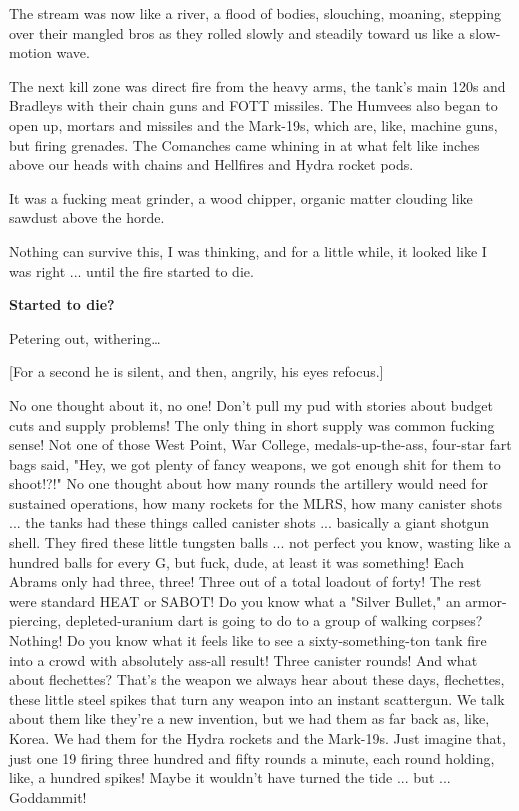 \documentclass[10pt,a5paper,twoside]{book}
\begin{document}
The stream was now like a river, a flood of bodies, slouching, moaning, stepping over their mangled bros as they rolled slowly and steadily toward us like a slow-motion wave.

The next kill zone was direct fire from the heavy arms, the tank's main 120s and Bradleys with their chain guns and FOTT missiles. The Humvees also began to open up, mortars and missiles and the Mark-19s, which are, like, machine guns, but firing grenades. The Comanches came whining in at what felt like inches above our heads with chains and Hellfires and Hydra rocket pods.

It was a fucking meat grinder, a wood chipper, organic matter clouding like sawdust above the horde.

Nothing can survive this, I was thinking, and for a little while, it looked like I was right ... until the fire started to die.

\textbf{Started to die?}

Petering out, withering…

[For a second he is silent, and then, angrily, his eyes refocus.]

No one thought about it, no one! Don't pull my pud with stories about budget cuts and supply problems! The only thing in short supply was common fucking sense! Not one of those West Point, War College, medals-up-the-ass, four-star fart bags said, "Hey, we got plenty of fancy weapons, we got enough shit for them to shoot!?!" No one thought about how many rounds the artillery would need for sustained operations, how many rockets for the MLRS, how many canister shots ... the tanks had these things called canister shots ... basically a giant shotgun shell. They fired these little tungsten balls ... not perfect you know, wasting like a hundred balls for every G, but fuck, dude, at least it was something! Each Abrams only had three, three! Three out of a total loadout of forty! The rest were standard HEAT or SABOT! Do you know what a "Silver Bullet," an armor-piercing, depleted-uranium dart is going to do to a group of walking corpses? Nothing! Do you know what it feels like to see a sixty-something-ton tank fire into a crowd with absolutely ass-all result! Three canister rounds! And what about flechettes? That's the weapon we always hear about these days, flechettes, these little steel spikes that turn any weapon into an instant scattergun. We talk about them like they're a new invention, but we had them as far back as, like, Korea. We had them for the Hydra rockets and the Mark-19s. Just imagine that, just one 19 firing three hundred and fifty rounds a minute, each round holding, like, a hundred spikes! Maybe it wouldn't have turned the tide ... but ... Goddammit!
\end{document}
